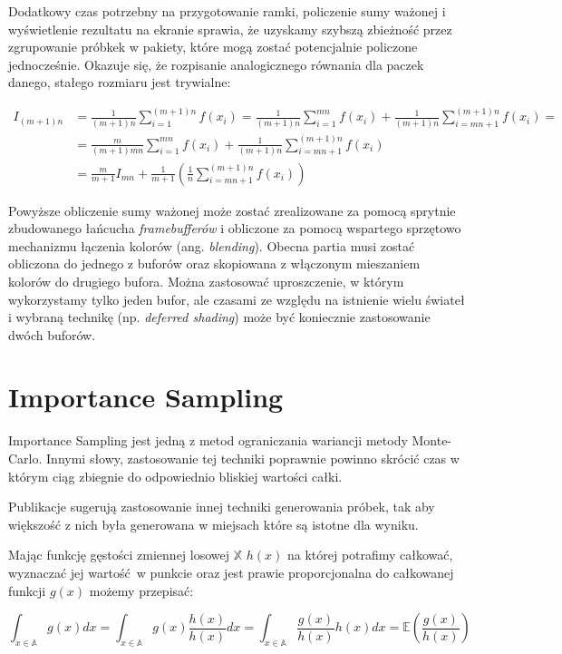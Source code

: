 \documentclass[../main.tex]{subfiles}
\begin{document}
Dodatkowy czas potrzebny na przygotowanie ramki, policzenie sumy ważonej i
wyświetlenie rezultatu na ekranie sprawia, że uzyskamy szybszą zbieżność przez
zgrupowanie próbkek w pakiety, które mogą zostać potencjalnie policzone
jednocześnie. Okazuje się, że rozpisanie analogicznego równania dla paczek
danego, stałego rozmiaru jest trywialne:

\begin{align*}
  I_{(m+1)n} &= \frac{1}{(m+1)n} \sum_{i=1}^{(m+1)n} f(x_i)
  = \frac{1}{(m+1)n} \sum_{i=1}^{mn} f(x_i)
    + \frac{1}{(m+1)n} \sum_{i=mn+1}^{(m+1)n} f(x_i) = \\
  &= \frac{m}{(m+1)mn} \sum_{i=1}^{mn} f(x_i)
    + \frac{1}{(m+1)n} \sum_{i=mn+1}^{(m+1)n} f(x_i) \\
  &= \frac{m}{m+1}I_{mn}
    + \frac{1}{m+1} \left(
        \frac{1}{n} \sum_{i=mn+1}^{(m+1)n} f(x_i)
    \right)
\end{align*}

Powyższe obliczenie sumy ważonej może zostać zrealizowane za pomocą sprytnie
zbudowanego łańcucha \textit{framebufferów} i obliczone za pomocą wspartego
sprzętowo mechanizmu łączenia kolorów (ang. \textit{blending}). Obecna partia
musi zostać obliczona do jednego z buforów oraz skopiowana z włączonym
mieszaniem kolorów do drugiego bufora. Można zastosować uproszczenie, w którym
wykorzystamy tylko jeden bufor, ale czasami ze względu na istnienie wielu
świateł i wybraną technikę (np. \textit{deferred shading}) może być koniecznie
zastosowanie dwóch buforów.

\section{Importance Sampling}

Importance Sampling jest jedną z metod ograniczania wariancji metody
Monte-Carlo. Innymi słowy, zastosowanie tej techniki poprawnie powinno
skrócić czas w którym ciąg zbiegnie do odpowiednio bliskiej wartości całki.

Publikacje \cite{Veach}\cite{MonteCarloAnderson} sugerują zastosowanie innej
techniki generowania próbek, tak aby większość z nich była generowana w
miejsach które są istotne dla wyniku.

Mając funkcję gęstości zmiennej losowej $\mathbb{X}$ $h(x)$ na której potrafimy
całkować, wyznaczać jej wartość w punkcie oraz jest prawie proporcjonalna do
całkowanej funkcji $g(x)$ możemy przepisać:

\[
  \int_{x \in \mathbb{A}} { g(x) dx } =
  \int_{x \in \mathbb{A}} { g(x) \frac{h(x)}{h(x)} dx } =
  \int_{x \in \mathbb{A}} { \frac{g(x)}{h(x)} h(x) dx } =
  \mathbb{E}\left({ \frac{g(x)}{h(x)} }\right)
\]
\end{document}
